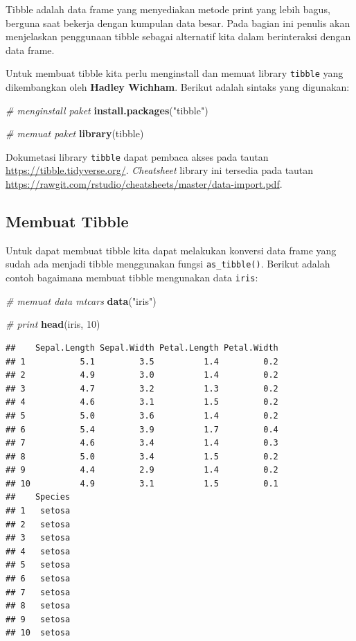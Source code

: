 \documentclass[]{book}
\newenvironment{Shaded}{\begin{snugshade}}{\end{snugshade}}
\newcommand{\KeywordTok}[1]{\textcolor[rgb]{0.13,0.29,0.53}{\textbf{#1}}}
\newcommand{\DecValTok}[1]{\textcolor[rgb]{0.00,0.00,0.81}{#1}}
\newcommand{\StringTok}[1]{\textcolor[rgb]{0.31,0.60,0.02}{#1}}
\newcommand{\CommentTok}[1]{\textcolor[rgb]{0.56,0.35,0.01}{\textit{#1}}}
\newcommand{\NormalTok}[1]{#1}
\begin{document}
Tibble adalah data frame yang menyediakan metode print yang lebih bagus,
berguna saat bekerja dengan kumpulan data besar. Pada bagian ini penulis
akan menjelaskan penggunaan tibble sebagai alternatif kita dalam
berinteraksi dengan data frame.

Untuk membuat tibble kita perlu menginstall dan memuat library
\texttt{tibble} yang dikembangkan oleh \textbf{Hadley Wichham}. Berikut
adalah sintaks yang digunakan:

\begin{Shaded}
\begin{Highlighting}[]
\CommentTok{# menginstall paket}
\KeywordTok{install.packages}\NormalTok{(}\StringTok{"tibble"}\NormalTok{)}

\CommentTok{# memuat paket}
\KeywordTok{library}\NormalTok{(tibble)}
\end{Highlighting}
\end{Shaded}

Dokumetasi library \texttt{tibble} dapat pembaca akses pada tautan
\url{https://tibble.tidyverse.org/}. \emph{Cheatsheet} library ini
tersedia pada tautan
\url{https://rawgit.com/rstudio/cheatsheets/master/data-import.pdf}.

\subsection{Membuat Tibble}\label{membuat-tibble}

Untuk dapat membuat tibble kita dapat melakukan konversi data frame yang
sudah ada menjadi tibble menggunakan fungsi \texttt{as\_tibble()}.
Berikut adalah contoh bagaimana membuat tibble mengunakan data
\texttt{iris}:

\begin{Shaded}
\begin{Highlighting}[]
\CommentTok{# memuat data mtcars}
\KeywordTok{data}\NormalTok{(}\StringTok{"iris"}\NormalTok{)}

\CommentTok{# print}
\KeywordTok{head}\NormalTok{(iris, }\DecValTok{10}\NormalTok{)}
\end{Highlighting}
\end{Shaded}

\begin{verbatim}
##    Sepal.Length Sepal.Width Petal.Length Petal.Width
## 1           5.1         3.5          1.4         0.2
## 2           4.9         3.0          1.4         0.2
## 3           4.7         3.2          1.3         0.2
## 4           4.6         3.1          1.5         0.2
## 5           5.0         3.6          1.4         0.2
## 6           5.4         3.9          1.7         0.4
## 7           4.6         3.4          1.4         0.3
## 8           5.0         3.4          1.5         0.2
## 9           4.4         2.9          1.4         0.2
## 10          4.9         3.1          1.5         0.1
##    Species
## 1   setosa
## 2   setosa
## 3   setosa
## 4   setosa
## 5   setosa
## 6   setosa
## 7   setosa
## 8   setosa
## 9   setosa
## 10  setosa
\end{verbatim}
\end{document}
